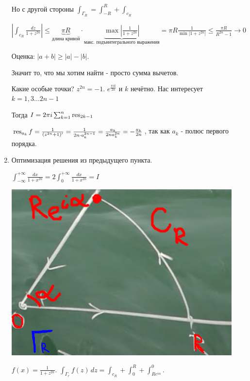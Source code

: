 \begin{example}
\begin{enumerate}
{            Но с другой стороны $\int_{\Gamma_R} = \int_{-R}^R + \int_{c_R}$

            $| \int_{c_R} \frac{dz}{1 + z^{2n}}| \leqslant \underbrace{\pi R}_{\text{длина кривой}} \cdot \underbrace{\max \left|\frac{1}{1 + z^{2n}}\right|}_{\text{макс. подъинтегрального выражения}} = \pi R \frac{1}{\min |1 + z^{2n}|}
            \leqslant \frac{\pi R}{R^{2n} - 1} \rightarrow 0$

            Оценка: $|a + b| \geqslant |a| - |b|$.

            Значит то, что мы хотим найти - просто сумма вычетов.

            Какие особые точки? $z^{2n} = -1$. $e^{\frac{\pi i k}{2n}}$ и $k$ нечётно.
            Нас интересует $k = 1, 3 \ldots 2n - 1$

            Тогда $I = 2 \pi i \sum_{k = 1}^n \operatorname{res}_{2k - 1}$

            $\operatorname{res}_{a_k} f = \frac{1}{(z^{2n} + 1)'} = \frac{1}{2n \cdot a_k^{2n - 1}} = \frac{a_k}{2na_k^{2n}} = -\frac{a_k}{2n}$, так как $a_k$ - полюс первого порядка.
        }
        \item {
            Оптимизация решения из предыдущего пункта.

            $\int_{-\infty}^{+\infty} \frac{dx}{1 + x^{2n}} = 2\int_{0}^{+\infty} \frac{dx}{1 + x^{2n}} = I$

            \begin{center}
                \includegraphics[width=12cm]{assets/04-functions-of-complex-variables/example-3-cauchy-about-deductions.png}
            \end{center}

            $f(x) = \frac{1}{1 + z^{2n}}$. $\int_{\Gamma_r} f(z) \, dz = \int_{c_R} + \int_{0}^{R} + \int_{Re^{i\alpha}}^{0}$.

}
\end{enumerate}
\end{example}
